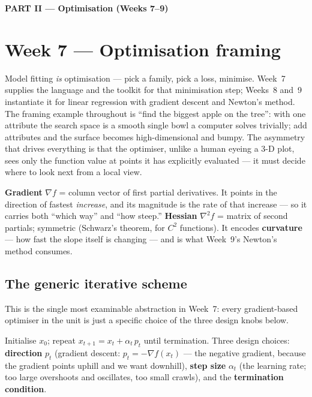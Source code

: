 \documentclass[11pt, a4paper]{article}
\newcommand{\kw}[1]{\textbf{#1}}
\begin{document}
\begin{center}\large\bfseries\color{defBd} PART II — Optimisation (Weeks 7–9)\end{center}

\section{Week 7 — Optimisation framing}

Model fitting \emph{is} optimisation — pick a family, pick a loss, minimise. Week~7 supplies the
language and the toolkit for that minimisation step; Weeks~8 and~9 instantiate it for linear
regression with gradient descent and Newton's method. The framing example throughout is ``find the
biggest apple on the tree'': with one attribute the search space is a smooth single bowl a computer
solves trivially; add attributes and the surface becomes high-dimensional and bumpy. The asymmetry
that drives everything is that the optimiser, unlike a human eyeing a 3-D plot, sees only the
function value at points it has explicitly evaluated — it must decide where to look next from a
local view.

\begin{defbox}
\kw{Gradient} $\nabla f$ = column vector of first partial derivatives. It points in the direction of
fastest \emph{increase}, and its magnitude is the rate of that increase — so it carries both ``which
way'' and ``how steep.'' \kw{Hessian} $\nabla^2 f$ = matrix of second partials; symmetric (Schwarz's
theorem, for $C^2$ functions). It encodes \kw{curvature} — how fast the slope itself is changing —
and is what Week~9's Newton's method consumes.
\end{defbox}

\subsection{The generic iterative scheme}

This is the single most examinable abstraction in Week~7: every gradient-based optimiser in the unit
is just a specific choice of the three design knobs below.

\begin{defbox}
Initialise $x_0$; repeat $x_{t+1}=x_t+\alpha_t\,p_t$ until termination. Three design choices:
\kw{direction} $p_t$ (gradient descent: $p_t=-\nabla f(x_t)$ — the negative gradient, because the
gradient points uphill and we want downhill), \kw{step size} $\alpha_t$ (the learning rate; too
large overshoots and oscillates, too small crawls), and the \kw{termination condition}.
\end{defbox}
\end{document}
